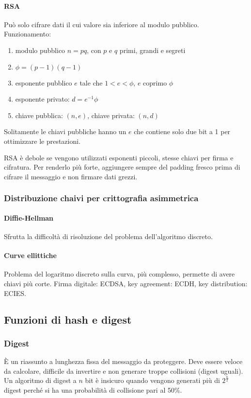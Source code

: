 \documentclass[11pt]{article}
\begin{document}
\paragraph*{RSA}
Può solo cifrare dati il cui valore sia inferiore al modulo pubblico. Funzionamento:
\begin{enumerate}
    \item modulo pubblico $n=pq$, con $p$ e $q$ primi, grandi e segreti
    \item $\phi=(p-1)(q-1)$
    \item esponente pubblico $e$ tale che $1<e<\phi$, $e$ coprimo $\phi$
    \item esponente privato: $d=e^{-1}\phi$
    \item chiave pubblica: $(n,e)$, chiave privata: $(n,d)$
\end{enumerate}
Solitamente le chiavi pubbliche hanno un $e$ che contiene solo due bit a 1 per ottimizzare le prestazioni.

RSA è debole se vengono utilizzati esponenti piccoli, stesse chiavi per firma e cifratura. Per renderlo più forte, 
aggiungere sempre del padding fresco prima di cifrare il messaggio e non firmare dati grezzi.
\subsubsection{Distribuzione chaivi per crittografia asimmetrica}
\paragraph*{Diffie-Hellman}
Sfrutta la difficoltà di risoluzione del problema dell'algoritmo discreto. 
\paragraph*{Curve ellittiche}
Problema del logaritmo discreto sulla curva, più complesso, permette di avere chiavi più corte. Firma digitale: ECDSA, key
agreement: ECDH, key distribution: ECIES.
\subsection{Funzioni di hash e digest}
\subsubsection{Digest}
È un riassunto a lunghezza fissa del messaggio da proteggere. Deve essere veloce da calcolare, difficile da invertire e 
non generare troppe collisioni (digest uguali). Un algoritmo di digest a $n$ bit è insicuro quando vengono generati più 
di $2^{\frac{n}{2}}$ digest perché si ha una probabilità di collisione pari al 50\%.
\end{document}
